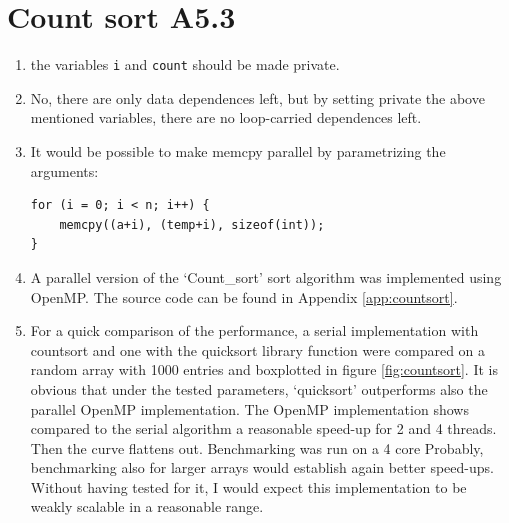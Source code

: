 \documentclass[a4paper,11pt,twoside]{article}
\begin{document}
\section{Count sort A5.3}
\begin{enumerate}[label={\alph*)}]
\item the variables \verb+i+ and \verb+count+ should be made private.
\item No, there are only data dependences left, but by setting private the above mentioned variables, there are no loop-carried dependences left. 
\item It would be possible to make memcpy parallel by parametrizing the arguments:
\begin{verbatim}
for (i = 0; i < n; i++) {
    memcpy((a+i), (temp+i), sizeof(int));
}
\end{verbatim}
  
\item A parallel version of the `Count\_sort' sort algorithm was implemented using OpenMP. The source code can be found in Appendix \ref{app:countsort}.
  
\item For a quick comparison of the performance, a serial implementation with countsort and one with the quicksort library function were compared on a random array with 1000 entries and boxplotted in figure \ref{fig:countsort}. It is obvious that under the tested parameters, `quicksort' outperforms also the parallel OpenMP implementation. The OpenMP implementation shows compared to the serial algorithm a reasonable speed-up for 2 and 4 threads. Then the curve flattens out. Benchmarking was run on a 4 core Probably, benchmarking also for larger arrays would establish again better speed-ups. Without having tested for it, I would expect this implementation to be weakly scalable in a reasonable range.  
\end{enumerate}
\end{document}
